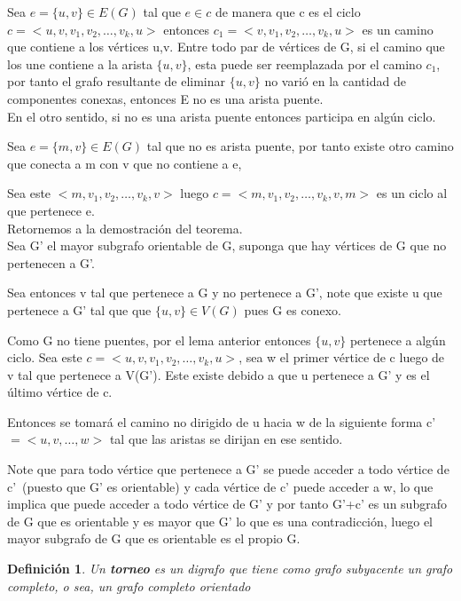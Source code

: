 \documentclass[a4paper,1pt]{report}
\newtheorem*{dfn}{Definición}
\begin{document}
Sea $e=\{u,v\}\in E(G)$ tal que $e\in c$ de manera que c es el ciclo $c=<u,v,v_1,v_2,\dots,v_k,u>$ entonces $c_1=<v,v_1,v_2,\dots,v_k,u>$ es un camino que contiene a los vértices u,v.
Entre todo par de vértices de G, si el camino que los une contiene a la arista $\{u,v\}$, esta puede ser reemplazada por el camino $c_1$, por tanto el grafo resultante de eliminar $\{u,v\}$ no varió en la cantidad de componentes conexas, entonces  E no es una arista puente.\\

En el otro sentido, si no es una arista puente entonces participa en algún ciclo.

Sea $e=\{m,v\}\in E(G)$ tal que no es arista puente, por tanto existe otro camino que conecta a m con v que no contiene a e, 

Sea este $<m,v_1,v_2,\dots,v_k,v>$  luego $c=<m,v_1,v_2,\dots,v_k,v,m>$ es un ciclo al que pertenece e.\\

Retornemos a la demostración del teorema.\\

Sea G' el mayor subgrafo orientable de G, suponga que hay vértices de G que no pertenecen a G'.

Sea entonces v tal que pertenece a G y no pertenece a G', note que existe u que pertenece a G' tal que que $\{u,v\}\in V(G)$ pues G es conexo.

Como G no tiene puentes, por el lema anterior entonces $\{u,v\}$ pertenece a algún ciclo. Sea este $c=<u,v,v_1,v_2,\dots,v_k,u>$, sea w el primer vértice de c luego de v tal que pertenece a V(G'). Este existe debido a que u pertenece a G' y es el último vértice de c.

Entonces se tomará el camino no dirigido de u hacia w de la siguiente forma c'$=<u,v,\dots,w>$ tal que las aristas se dirijan en ese sentido.

Note que para todo vértice que pertenece a G' se puede acceder a todo vértice de c'~(puesto que G' es orientable) y cada vértice de c' puede acceder a w, lo que implica que puede acceder a todo vértice de G' y por tanto G'+c' es un subgrafo de G que es orientable y es mayor que G' lo que es una contradicción, luego el mayor subgrafo de G que es orientable es el propio G.

\begin{dfn}
 Un \textbf{torneo} es un digrafo que tiene como grafo subyacente un grafo completo, o sea, un grafo completo orientado
\end{dfn}
\end{document}
